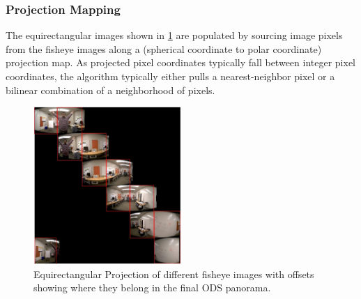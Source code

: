 \subsubsection{Projection Mapping}The equirectangular images shown in \ref{fig:ODS_Proj} are populated by sourcing image pixels from the fisheye images along a (spherical coordinate to polar coordinate) projection map. As projected pixel coordinates typically fall between integer pixel coordinates, the algorithm typically either pulls a nearest-neighbor pixel or a bilinear combination of a neighborhood of pixels. 
\begin{figure}[h]
	\begin{center}
		\includegraphics[width=0.5\textwidth]{data/images/EqRect_offset_fov_viz_loop_v3.jpg}
		\caption{Equirectangular Projection of different fisheye images with offsets showing where they belong in the final ODS panorama.}
		\label{fig:ODS_Proj}
	\end{center}
\end{figure} 

